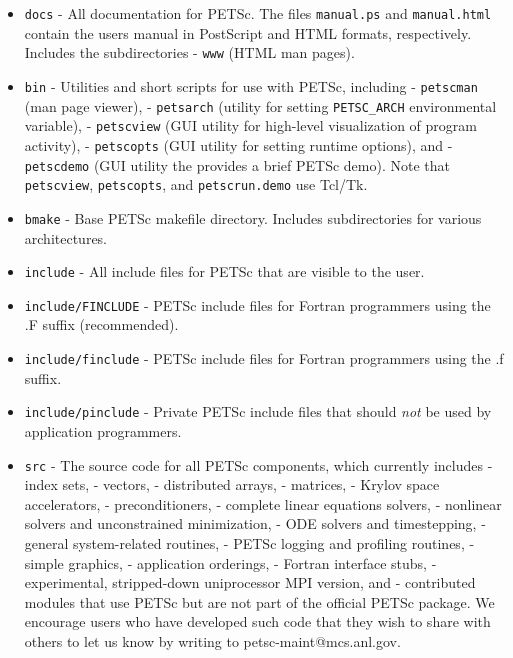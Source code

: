 \begin{itemize}
\item {\tt docs} - All documentation for PETSc. The files {\tt manual.ps}
                   and {\tt manual.html} contain the users manual in
                   PostScript and HTML formats, respectively. Includes
                   the subdirectories
 \subitem - {\tt www} (HTML man pages).
\item {\tt bin} - Utilities and short scripts for use with PETSc, including
 \subitem - {\tt petscman} (man page viewer),
 \subitem - {\tt petsarch} (utility for setting {\tt PETSC\_ARCH} environmental variable),
 \subitem - {\tt petscview} (GUI utility for high-level visualization of program activity),
 \subitem - {\tt petscopts} (GUI utility for setting runtime options), and
 \subitem - {\tt petscdemo} (GUI utility the provides a brief PETSc demo).
Note that {\tt petscview}, {\tt petscopts}, and {\tt petscrun.demo} use Tcl/Tk.
\item {\tt bmake} - Base PETSc makefile directory.  Includes subdirectories
                    for various architectures.
\item {\tt include} - All include files for PETSc that are visible to the user.
\item {\tt include/FINCLUDE} - PETSc include files for Fortran programmers using 
                               the .F suffix (recommended).
\item {\tt include/finclude} - PETSc include files for Fortran programmers using 
                               the .f suffix.
\item {\tt include/pinclude} - Private PETSc include files that should {\em not} be used by application programmers.
\item {\tt src} - The source code for all PETSc components, which
                  currently includes
  - index sets,
  - vectors,
  - distributed arrays,
  - matrices,
  - Krylov space accelerators,
  - preconditioners,
  - complete linear equations solvers,
  - nonlinear solvers and unconstrained minimization,
  - ODE solvers and timestepping,
  - general system-related routines,
  - PETSc logging and profiling routines,
  - simple graphics,
  - application orderings,
  - Fortran interface stubs,
  - experimental, stripped-down uniprocessor MPI version, and
  - contributed modules that use PETSc but are not
    part of the official PETSc package.  We encourage users who have
    developed such code that they wish to share with others to let us
    know by writing to petsc-maint@mcs.anl.gov.
\end{itemize}

